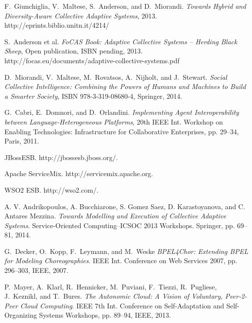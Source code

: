 \documentclass{llncs}
\begin{document}
%
%
%
\begin{thebibliography}{1}

F.~Giunchiglia, V.~Maltese, S.~Anderson, and D.~Miorandi. \emph{Towards Hybrid and Diversity-Aware Collective Adaptive Systems}, 2013. http://eprints.biblio.unitn.it/4214/

S.~Anderson et al. \emph{FoCAS Book: Adaptive Collective Systems – Herding Black Sheep}, Open publication, ISBN pending, 2013. http://focas.eu/documents/adaptive-collective-systems.pdf

D.~Miorandi, V.~Maltese, M.~Rovatsos, A.~Nijholt, and J.~Stewart. \emph{Social Collective Intelligence: Combining the Powers of Humans and Machines to Build a Smarter Society}, ISBN 978-3-319-08680-4, Springer, 2014.

G.~Cabri, E.~Domnori, and D.~Orlandini. \emph{Implementing Agent Interoperability between Language-Heterogeneous Platforms}, 20th IEEE Int. Workshop on Enabling Technologies: Infrastructure for Collaborative Enterprises, pp. 29--34, Paris, 2011.

JBossESB. http://jbossesb.jboss.org/.

Apache ServiceMix. http://servicemix.apache.org.

WSO2 ESB. http://wso2.com/.

A. V. Andrikopoulos, A. Bucchiarone, S. Gomez Saez, D. Karastoyanova, and C. Antares Mezzina. \emph{Towards Modelling and Execution of Collective Adaptive Systems}. Service-Oriented Computing–ICSOC 2013 Workshops. Springer, pp. 69--81, 2014.

G.~Decker, O.~Kopp, F.~Leymann, and M.~Weske \emph{BPEL4Chor: Extending BPEL for Modeling Choreographies}.  IEEE Int. Conference on Web Services 2007, pp. 296--303, IEEE, 2007.

P.~Mayer, A.~Klarl, R.~Hennicker, M.~Puviani, F.~Tiezzi, R.~Pugliese, J.~Keznikl, and T.~Bures. \emph{The Autonomic Cloud: A Vision of Voluntary, Peer-2-Peer Cloud Computing}. IEEE 7th Int. Conference on Self-Adaptation and Self-Organizing Systems Workshops, pp. 89--94, IEEE, 2013.


\end{thebibliography}
\end{document}
